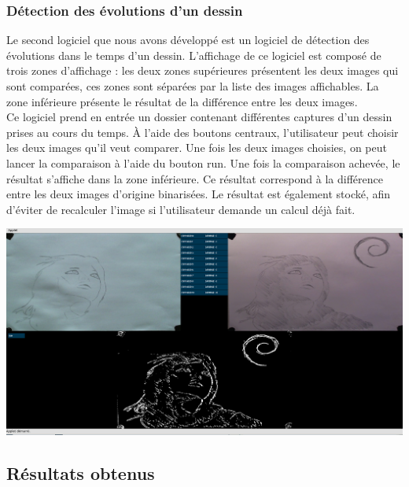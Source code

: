 \subsubsection{Détection des évolutions d'un dessin}

Le second logiciel que nous avons développé est un logiciel de détection des évolutions dans le temps d'un dessin. L'affichage de ce logiciel est composé de trois zones d'affichage : les deux zones supérieures présentent les deux images qui sont comparées, ces zones sont séparées par la liste des images affichables. La zone inférieure présente le résultat de la différence entre les deux images.\\

Ce logiciel prend en entrée un dossier contenant différentes captures d'un dessin prises au cours du temps. À l'aide des boutons centraux, l'utilisateur peut choisir les deux images qu'il veut comparer. Une fois les deux images choisies, on peut lancer la comparaison à l'aide du bouton run. Une fois la comparaison achevée, le résultat s'affiche dans la zone inférieure. Ce résultat correspond à la différence entre les deux images d'origine binarisées. Le résultat est également stocké, afin d'éviter de recalculer l'image si l'utilisateur demande un calcul déjà fait.\\

\begin{center}
\includegraphics[width=\textwidth]{images/evolution1.png}
\end{center}

\subsection{Résultats obtenus}